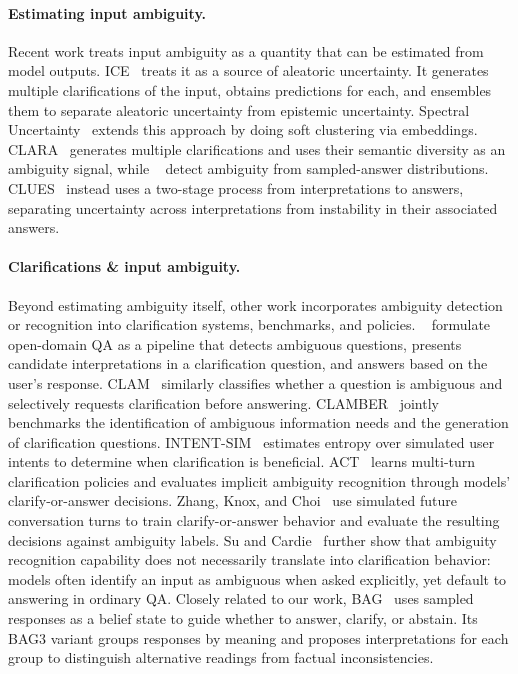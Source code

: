 \paragraph{Estimating input ambiguity.} 
Recent work treats input ambiguity as a quantity that can be estimated from model outputs.
ICE~\citep{pmlr-v235-hou24b} treats it as a source of aleatoric uncertainty. It generates multiple clarifications of the input, obtains predictions for each, and ensembles them to separate aleatoric uncertainty from epistemic uncertainty.
Spectral Uncertainty~\citep{epub135635} extends this approach by doing soft clustering via embeddings.
CLARA~\citep{rosseeuw2025clara} generates multiple clarifications and uses their semantic diversity as an ambiguity signal, while ~\citet{shi-etal-2025-ambiguity} detect ambiguity from sampled-answer distributions.
CLUES~\citep{ziletti-dambrosi-2026-disentangling} instead uses a two-stage process from interpretations to answers, separating uncertainty across interpretations from instability in their associated answers.


\paragraph{Clarifications \& input ambiguity.}
Beyond estimating ambiguity itself, other work incorporates ambiguity detection or recognition into clarification systems, benchmarks, and policies.
~\citet{lee-etal-2023-asking} formulate open-domain QA as a pipeline that detects ambiguous questions, presents candidate interpretations in a clarification question, and answers based on the user's response.
CLAM~\citep{kuhn2023clamselectiveclarificationambiguous} similarly classifies whether a question is ambiguous and selectively requests clarification before answering.
CLAMBER~\citep{zhang-etal-2024-clamber} jointly benchmarks the identification of ambiguous information needs and the generation of clarification questions.
INTENT-SIM~\citep{zhang-choi-2025-clarify} estimates entropy over simulated user intents to determine when clarification is beneficial.
ACT~\citep{chen2025learning} learns multi-turn clarification policies and evaluates implicit ambiguity recognition through models' clarify-or-answer decisions.
Zhang, Knox, and Choi~\citep{zhang2025modeling} use simulated future conversation turns to train clarify-or-answer behavior and evaluate the resulting decisions against ambiguity labels.
Su and Cardie~\citep{su2026knowingshowingllmsrecognize} further show that ambiguity recognition capability does not necessarily translate into clarification behavior: models often identify an input as ambiguous when asked explicitly, yet default to answering in ordinary QA.
Closely related to our work, BAG~\citep{baan2026clarify} uses sampled responses as a belief state to guide whether to answer, clarify, or abstain. Its BAG3 variant groups responses by meaning and proposes interpretations for each group to distinguish alternative readings from factual inconsistencies.


